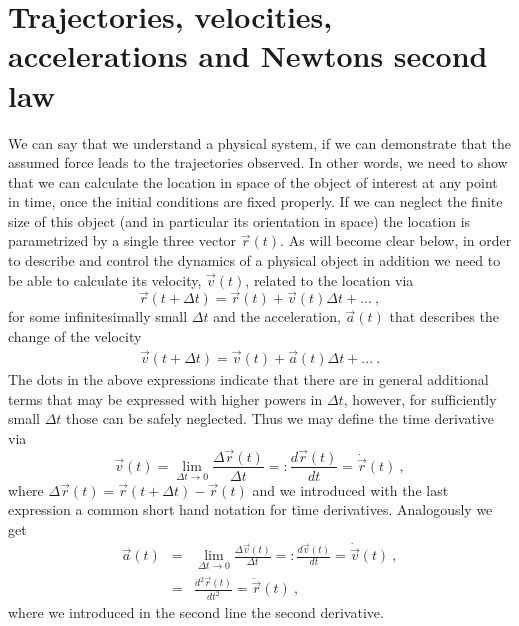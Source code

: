 \documentclass[12pt,ngerman,american]{iopart}
\begin{document}
\section{Trajectories, velocities, accelerations and Newtons second law}\label{sec:tva}

We can say that we understand a physical system, if we can demonstrate that the assumed force leads to the trajectories observed.
In other words, we need to show that we can calculate the location in space of the object of interest at any point in time, once the initial conditions are fixed properly.
If we can neglect the finite size of this object (and in particular its orientation in space) the location is parametrized by a single three vector $\vec r(t)$.
As will become clear below, in order to describe and control the dynamics of a physical object in addition we need to be able to calculate its velocity, $\vec v(t)$, related to the location via
\begin{equation}\label{eq:x_update}
\vec r(t+\Delta t) = \vec r(t) + \vec v(t) \Delta t + ... \ , \label{eq:vdef}
\end{equation}
for some infinitesimally small $\Delta t$ and the acceleration, $\vec a(t)$ that describes the change of the velocity
\begin{eqnarray}\label{eq:v_update}
\vec v(t+\Delta t) = \vec v(t) + \vec a(t) \Delta t + ...\ . \label{eq:adef}
\end{eqnarray}
The dots in the above expressions indicate that there are in general additional terms that may be expressed with higher powers in $\Delta t$, however, for sufficiently small $\Delta t$ those can be safely neglected.
Thus we may define the time derivative via
\begin{equation}
\vec v(t) = \lim_{\Delta t\to 0} \frac{\Delta \vec r(t)}{\Delta t} =: \frac{d\vec r(t)}{d t}  = \dot{\vec  r}(t) \ ,
\end{equation}
where $\Delta \vec r(t)=\vec r(t+\Delta t)-\vec r(t)$ and we introduced with the last expression a common short hand notation for time derivatives.
Analogously we get
\begin{eqnarray}
\vec a(t) &=& \lim_{\Delta t\to 0} \frac{\Delta \vec v(t)}{\Delta t} =: \frac{d\vec v(t)}{dt}  = \dot{\vec v}(t) \ , \\
 &=& \frac{d^2\vec r(t)}{dt^2}  = \ddot{\vec r}(t) \ ,
\end{eqnarray}
where we introduced in the second line the second derivative.
\end{document}
